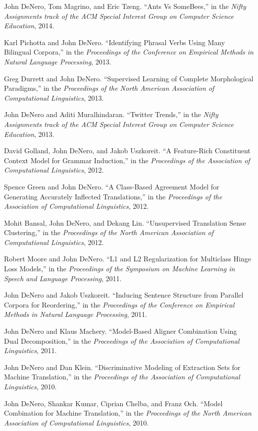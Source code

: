 \documentclass[margin,line]{res}
\begin{document}
\begin{resume}
John DeNero, Tom Magrino, and Eric Tzeng.  ``Ants Vs SomeBees,'' in the {\it Nifty Assignments track of the ACM Special Interest Group on Computer Science Education}, 2014.

Karl Pichotta and John DeNero.  ``Identifying Phrasal Verbs Using Many Bilingual Corpora,'' in the {\it Proceedings of the Conference on Empirical Methods in Natural Language Processing}, 2013.

Greg Durrett and John DeNero.  ``Supervised Learning of Complete Morphological Paradigms,'' in the {\it Proceedings of the North American Association of Computational Linguistics}, 2013.

John DeNero and Aditi Muralhindaran.  ``Twitter Trends,'' in the {\it Nifty Assignments track of the ACM Special Interest Group on Computer Science Education}, 2013.

David Golland, John DeNero, and Jakob Uszkoreit. ``A Feature-Rich Constituent Context Model for Grammar Induction,'' in the {\it Proceedings of the Association of Computational Linguistics}, 2012.

Spence Green and John DeNero. ``A Class-Based Agreement Model for Generating Accurately Inflected Translations,'' in the {\it Proceedings of the Association of Computational Linguistics}, 2012.

Mohit Bansal, John DeNero, and Dekang Lin. ``Unsupervised Translation Sense Clustering,'' in the {\it Proceedings of the North American Association of Computational Linguistics}, 2012.

Robert Moore and John DeNero. ``L1 and L2 Regularization for Multiclass Hinge Loss Models,'' in the {\it Proceedings of the Symposium on Machine Learning in Speech and Language Processing}, 2011.

John DeNero and Jakob Uszkoreit.  ``Inducing Sentence Structure from Parallel Corpora for Reordering,'' in the {\it Proceedings of the Conference on Empirical Methods in Natural Language Processing}, 2011.

John DeNero and Klaus Machery. ``Model-Based Aligner Combination Using Dual Decomposition,'' in the {\it Proceedings of the Association of Computational Linguistics}, 2011.

John DeNero and Dan Klein. ``Discriminative Modeling of Extraction Sets for Machine Translation,'' in the {\it Proceedings of the Association of Computational Linguistics}, 2010.

John DeNero, Shankar Kumar, Ciprian Chelba, and Franz Och. ``Model Combination for Machine Translation,'' in the {\it Proceedings of the North American Association of Computational Linguistics}, 2010.


\end{resume}
\end{document}
